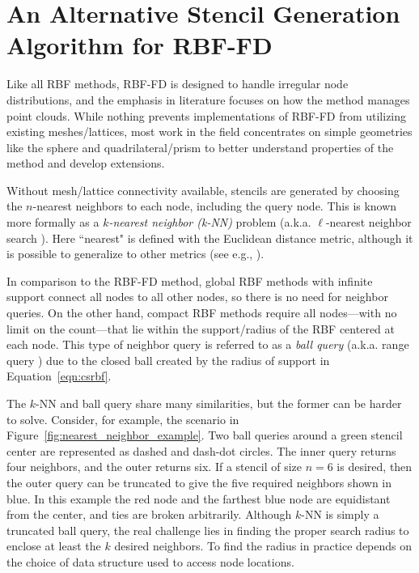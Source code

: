 \documentclass{report}
\begin{document}
\fi




\chapter{An Alternative Stencil Generation Algorithm for RBF-FD}
\label{chap:stencils}

Like all RBF methods, RBF-FD is designed to handle irregular node distributions, and the emphasis in literature focuses on how the method manages point clouds. While nothing prevents implementations of RBF-FD from utilizing existing meshes/lattices, most work in the field concentrates on simple geometries like the sphere \cite{FlyerWright07,FlyerLehto10,FlyerLehto11,FlyerWright09} and quadrilateral/prism \cite{FiNDTHESE} to better understand properties of the method and develop extensions. 


Without mesh/lattice connectivity available, stencils are generated by choosing the $n$-nearest neighbors to each node, including the query node. This is known more formally as a \emph{$k$-nearest neighbor (k-NN)} problem \cite{TagliasacchiMFE} (a.k.a. $\ell$-nearest neighbor search \cite{WendlandBook}). Here ``nearest" is defined with the Euclidean distance metric, although it is possible to generalize to other metrics (see e.g., \cite{MatlabKDTreeSearcher}). 

In comparison to the RBF-FD method, global RBF methods with infinite support connect all nodes to all other nodes, so there is no need for neighbor queries. On the other hand, compact RBF methods require all nodes---with no limit on the count---that lie within the support/radius of the RBF centered at each node. This type of neighbor query is referred to as a \emph{ball query} (a.k.a. range query \cite{WendlandBook}) due to the closed ball created by the radius of support in Equation~\ref{eqn:csrbf}. 

The $k$-NN and ball query share many similarities, but the former can be harder to solve. Consider, for example, the scenario in Figure~\ref{fig:nearest_neighbor_example}. Two ball queries around a green stencil center are represented as dashed and dash-dot circles. The inner query returns four neighbors, and the outer returns six. If a stencil of size $n=6$ is desired, then the outer query can be truncated to give the five required neighbors shown in blue. In this example the red node and the farthest blue node are equidistant from the center, and ties are broken arbitrarily. Although $k$-NN is simply a truncated ball query, the real challenge lies in finding the proper search radius to enclose at least the $k$ desired neighbors. To find the radius in practice depends on the choice of data structure used to access node locations. 
\end{document}
